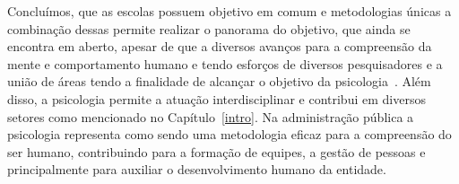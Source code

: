 Concluímos, que as escolas possuem objetivo em comum e metodologias únicas a combinação dessas permite realizar o panorama do objetivo, que ainda se encontra em aberto, apesar de que a diversos avanços para a compreensão da mente e comportamento humano e tendo esforços de diversos pesquisadores e a união de áreas tendo a finalidade de alcançar o objetivo da psicologia~\cite{sternberg2000psicologia,eysenck2017psi_cognitiva}.
Além disso, a psicologia permite a atuação interdisciplinar e contribui em diversos setores como mencionado no Capítulo~\ref{intro}. 
Na administração pública a psicologia representa como sendo uma metodologia eficaz para a compreensão do ser humano, contribuindo para a formação de equipes, a gestão de pessoas e principalmente para auxiliar o desenvolvimento humano da entidade.
